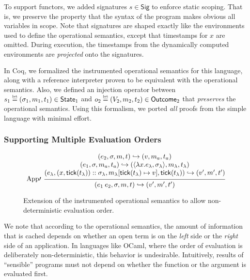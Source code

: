 \documentclass[acmsmall,screen,review]{acmart}\settopmatter{printfolios=true,printccs=false,printacmref=false}
\theoremstyle{acmdefinition}
\newcommand*{\cons}{::}
\newcommand*{\ctx}{\sigma}
\newcommand*{\Sig}{\mathsf{Sig}}
\newcommand*{\mem}{m}
\newcommand*{\texteq}[1]{\stackrel{\mathclap{\tiny\normalfont\mbox{#1}}}{=}}
\newcommand*{\State}{\mathsf{State}}
\newcommand*{\Outcome}{\mathsf{Outcome}}
\newcommand*{\semarrow}{\hookrightarrow}
\newcommand*{\tick}{\mathsf{tick}}
\begin{document}
To support functors, we added signatures $s\in\Sig$ to enforce static scoping.
That is, we preserve the property that the syntax of the program makes obvious all variables in scope.
Note that signatures are shaped exactly like the environments used to define the operational semantics, except that timestamps for $x$ are omitted.
During execution, the timestamps from the dynamically computed environments are \emph{projected} onto the signatures.

In Coq, we formalized the instrumented operational semantics for this language, along with a reference interpreter proven to be equivalent with the operational semantics.
Also, we defined an injection operator between $s_1\texteq{let}(\ctx_1,\mem_1,t_1)\in\State_1$ and $o_2\texteq{let}(V_2,\mem_2,t_2)\in\Outcome_2$ that \emph{preserves} the operational semantics.
Using this formalism, we ported \emph{all} proofs from the simple language with minimal effort.

\subsubsection{Supporting Multiple Evaluation Orders}
\begin{figure}[h!]
  \scriptsize
  \begin{flushright}
    \fbox{$(e,\ctx,\mem,t)\semarrow(V,\mem',t')\text{ or }(e',\ctx',\mem',t')$}
  \end{flushright}
  \[
    \begin{prooftree}
      \hypo{
        \begin{matrix}
          (e_{2}, \ctx, \mem, t)
          \semarrow
          (v, \mem_{a}, t_{a})                                                               \\
          (e_{1}, \ctx, \mem_{a}, t_{a})
          \semarrow
          (\langle\lambda x.e_{\lambda}, \ctx_{\lambda}\rangle, \mem_{\lambda}, t_{\lambda}) \\
          (e_{\lambda}, (x, \tick(t_{\lambda}))\cons \ctx_{\lambda}, \mem_{\lambda}[\tick(t_{\lambda})\mapsto v], \tick(t_{\lambda}))
          \semarrow
          (v', \mem',t')
        \end{matrix}
      }
      \infer[left label={App$\prime$}]1{
      (e_{1}\:e_{2}, \ctx, \mem, t)
      \semarrow
      (v', \mem',t')
      }
    \end{prooftree}
  \]
  \caption{Extension of the instrumented operational semantics to allow non-deterministic evaluation order.}
  \label{fig:cbvorder}
\end{figure}
We note that according to the operational semantics, the amount of information that is cached depends on whether an open term is on the \emph{left} side or the \emph{right} side of an application.
In languages like OCaml, where the order of evaluation is deliberately non-deterministic, this behavior is undesirable.
Intuitively, results of ``sensible'' programs must not depend on whether the function or the argument is evaluated first.
\end{document}
